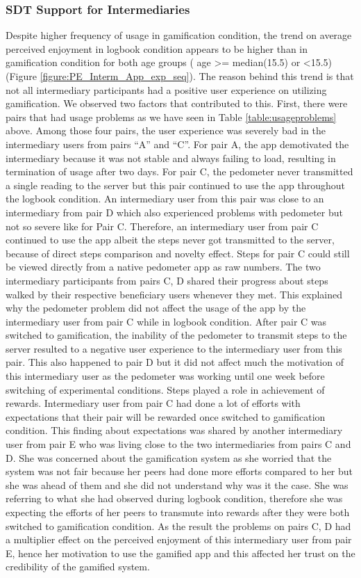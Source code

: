 \documentclass{sig-alternate}
\begin{document}
\subsubsection{{SDT Support for Intermediaries}}  
Despite higher frequency of usage in gamification condition, the trend on average perceived enjoyment in logbook condition appears to be higher than in gamification condition for both age groups ( age \textgreater = median(15.5) or \textless 15.5) (Figure \ref{figure:PE_Interm_App_exp_seq}). The reason behind this trend is that not all intermediary participants had a positive user experience on utilizing gamification. We observed two factors that contributed  to this. First, there were pairs that had usage problems as we have seen in Table \ref{table:usageproblems} above. Among those four pairs, the user experience was severely bad in the intermediary users from pairs ``A'' and ``C''. For pair A, the app demotivated the intermediary because it was not stable and always failing to load, resulting in termination of usage after two days. For pair C, the pedometer never transmitted a single reading to the server but this pair continued to use the app throughout the logbook condition. An intermediary user from this pair was close to an intermediary from pair D which also experienced problems with pedometer but not so severe like for Pair C. Therefore, an intermediary user from pair C continued to use the app albeit the steps never got transmitted to the server, because of direct steps comparison and novelty effect. Steps for pair C could still be viewed directly from a native pedometer app as raw numbers. The two intermediary participants from pairs C, D shared their progress about steps walked by their respective beneficiary users whenever they met. This explained why the pedometer problem did not affect the usage of the app by the intermediary user from pair C while in logbook condition. After pair C was switched to gamification, the inability of the pedometer to transmit steps to the server resulted to a negative user experience to the intermediary user from this pair. This also happened to pair D but it did not affect much the motivation of this intermediary user as the pedometer was working until one week before switching of experimental conditions. Steps played a role in achievement of rewards. Intermediary user from pair C had done a lot of efforts with expectations that their pair will be rewarded once switched to gamification condition. This finding about expectations was shared by another intermediary user from pair E who was living close  to the two intermediaries from pairs C and D. She was concerned about the gamification system as she worried that the system was not fair because her peers had done more efforts compared to her but she was ahead of them and she did not understand why was it the case. She was referring to what she had observed during logbook condition,  therefore she was expecting the efforts of her peers to transmute into rewards after they were both switched to gamification condition. As the result the problems on pairs C, D had a multiplier  effect on the perceived enjoyment of this intermediary user from pair E, hence her motivation to use the gamified app and this affected her trust on the credibility of the gamified system.
\end{document}
